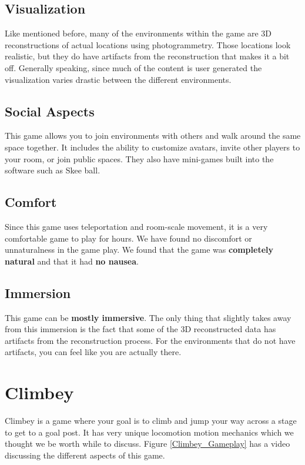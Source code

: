 \documentclass[journal]{IEEEtran}
\begin{document}
\subsection{Visualization}
Like mentioned before, many of the environments within the game are 3D reconstructions of actual locations using photogrammetry. Those locations look realistic, but they do have artifacts from the reconstruction that makes it a bit off. Generally speaking, since much of the content is user generated the visualization varies drastic between the different environments. 
\subsection{Social Aspects}
This game allows you to join environments with others and walk around the same space together. It includes the ability to customize avatars, invite other players to your room, or join public spaces. They also have mini-games built into the software such as Skee ball. 
\subsection{Comfort}
Since this game uses teleportation and room-scale movement, it is a very comfortable game to play for hours. We have found no discomfort or unnaturalness in the game play. We found that the game was \textbf{completely natural} and that it had \textbf{no nausea}.

\subsection{Immersion}
This game can be \textbf{mostly immersive}. The only thing that slightly takes away from this immersion is the fact that some of the 3D reconstructed data has artifacts from the reconstruction process. For the environments that do not have artifacts, you can feel like you are actually there. 

\section{Climbey}
Climbey is a game where your goal is to climb and jump your way across a stage to get to a goal post. It has very unique locomotion motion mechanics which we thought we be worth while to discuss. Figure \ref{Climbey_Gameplay} has a video discussing the different aspects of this game. 


\begin{figure}[h!]
	\centering
\end{figure}
\end{document}
